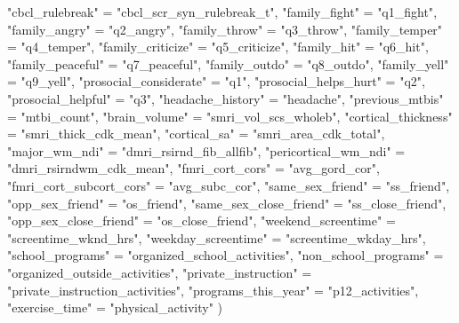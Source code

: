 \documentclass[
  letterpaper,
  DIV=11,
  numbers=noendperiod]{scrreprt}
\newenvironment{Shaded}{\begin{snugshade}}{\end{snugshade}}
\newcommand{\NormalTok}[1]{\textcolor[rgb]{0.00,0.23,0.31}{#1}}
\newcommand{\OtherTok}[1]{\textcolor[rgb]{0.00,0.23,0.31}{#1}}
\newcommand{\StringTok}[1]{\textcolor[rgb]{0.13,0.47,0.30}{#1}}
\begin{document}
\begin{Shaded}
\begin{Highlighting}[]
    \StringTok{"cbcl\_rulebreak"} \OtherTok{=} \StringTok{"cbcl\_scr\_syn\_rulebreak\_t"}\NormalTok{,}
    \StringTok{"family\_fight"} \OtherTok{=} \StringTok{"q1\_fight"}\NormalTok{,}
    \StringTok{"family\_angry"} \OtherTok{=} \StringTok{"q2\_angry"}\NormalTok{,}
    \StringTok{"family\_throw"} \OtherTok{=} \StringTok{"q3\_throw"}\NormalTok{,}
    \StringTok{"family\_temper"} \OtherTok{=} \StringTok{"q4\_temper"}\NormalTok{,}
    \StringTok{"family\_criticize"} \OtherTok{=} \StringTok{"q5\_criticize"}\NormalTok{,}
    \StringTok{"family\_hit"} \OtherTok{=} \StringTok{"q6\_hit"}\NormalTok{,}
    \StringTok{"family\_peaceful"} \OtherTok{=} \StringTok{"q7\_peaceful"}\NormalTok{,}
    \StringTok{"family\_outdo"} \OtherTok{=} \StringTok{"q8\_outdo"}\NormalTok{,}
    \StringTok{"family\_yell"} \OtherTok{=} \StringTok{"q9\_yell"}\NormalTok{,}
    \StringTok{"prosocial\_considerate"} \OtherTok{=} \StringTok{"q1"}\NormalTok{,}
    \StringTok{"prosocial\_helps\_hurt"} \OtherTok{=} \StringTok{"q2"}\NormalTok{,}
    \StringTok{"prosocial\_helpful"} \OtherTok{=} \StringTok{"q3"}\NormalTok{,}
    \StringTok{"headache\_history"} \OtherTok{=} \StringTok{"headache"}\NormalTok{,}
    \StringTok{"previous\_mtbis"} \OtherTok{=} \StringTok{"mtbi\_count"}\NormalTok{,}
    \StringTok{"brain\_volume"} \OtherTok{=} \StringTok{"smri\_vol\_scs\_wholeb"}\NormalTok{,}
    \StringTok{"cortical\_thickness"} \OtherTok{=} \StringTok{"smri\_thick\_cdk\_mean"}\NormalTok{,}
    \StringTok{"cortical\_sa"} \OtherTok{=} \StringTok{"smri\_area\_cdk\_total"}\NormalTok{,}
    \StringTok{"major\_wm\_ndi"} \OtherTok{=} \StringTok{"dmri\_rsirnd\_fib\_allfib"}\NormalTok{,}
    \StringTok{"pericortical\_wm\_ndi"} \OtherTok{=} \StringTok{"dmri\_rsirndwm\_cdk\_mean"}\NormalTok{,}
    \StringTok{"fmri\_cort\_cors"} \OtherTok{=} \StringTok{"avg\_gord\_cor"}\NormalTok{,}
    \StringTok{"fmri\_cort\_subcort\_cors"} \OtherTok{=} \StringTok{"avg\_subc\_cor"}\NormalTok{,}
    \StringTok{"same\_sex\_friend"} \OtherTok{=} \StringTok{"ss\_friend"}\NormalTok{,}
    \StringTok{"opp\_sex\_friend"} \OtherTok{=} \StringTok{"os\_friend"}\NormalTok{,}
    \StringTok{"same\_sex\_close\_friend"} \OtherTok{=} \StringTok{"ss\_close\_friend"}\NormalTok{,}
    \StringTok{"opp\_sex\_close\_friend"} \OtherTok{=} \StringTok{"os\_close\_friend"}\NormalTok{,}
    \StringTok{"weekend\_screentime"} \OtherTok{=} \StringTok{"screentime\_wknd\_hrs"}\NormalTok{,}
    \StringTok{"weekday\_screentime"} \OtherTok{=} \StringTok{"screentime\_wkday\_hrs"}\NormalTok{,}
    \StringTok{"school\_programs"} \OtherTok{=} \StringTok{"organized\_school\_activities"}\NormalTok{,}
    \StringTok{"non\_school\_programs"} \OtherTok{=} \StringTok{"organized\_outside\_activities"}\NormalTok{,}
    \StringTok{"private\_instruction"} \OtherTok{=} \StringTok{"private\_instruction\_activities"}\NormalTok{,}
    \StringTok{"programs\_this\_year"} \OtherTok{=} \StringTok{"p12\_activities"}\NormalTok{,}
    \StringTok{"exercise\_time"} \OtherTok{=} \StringTok{"physical\_activity"}
\NormalTok{)}


\end{Highlighting}
\end{Shaded}
\end{document}
